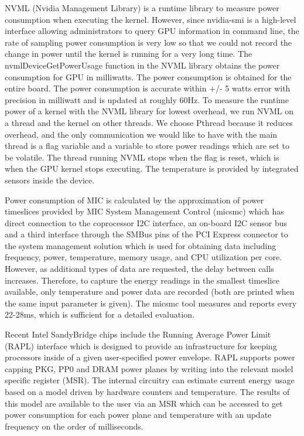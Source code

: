 NVML (Nvidia Management Library) \cite{R:16} is a runtime library to measure power consumption when executing the kernel. However, since nvidia-smi is a high-level interface allowing administrators to query GPU information in command line, the rate of sampling power consumption is very low so that we could not record the change in power until the kernel is running for a very long time. The nvmlDeviceGetPowerUsage function in the NVML library obtains the power consumption  for GPU in milliwatts. The power consumption is obtained for the entire board. The power consumption is accurate within +/- 5 watts error with precision in milliwatt and is updated at roughly 60Hz. To measure the runtime power of a kernel with the NVML library for lowest overhead, we run NVML on a thread and the kernel on other threads. We choose Pthread because it reduces overhead, and the only communication we would like to have with the main thread is a flag variable and a variable to store power readings which are set to be volatile. The thread running NVML stops when the flag is reset, which is when the GPU kernel stops executing. The temperature is provided by integrated sensors inside the device.

 Power consumption of MIC is calculated by the approximation of power timeslices provided by MIC System Management Control (micsmc) \cite{R:17} which has direct connection to the coprocessor I2C interface, an on-board I2C sensor bus and a third interface through the SMBus pins of the PCI Express connector to the system management solution which is used for obtaining data including frequency, power, temperature, memory usage, and CPU utilization per core. However, as additional types of data are requested, the delay between calls increases. Therefore, to capture the energy readings in the smallest timeslice available, only temperature and power data are recorded (both are printed when the same input parameter is given). The micsmc tool measures and reports every 22-28ms, which is sufficient for a detailed evaluation. 


 Recent Intel SandyBridge chips include the Running Average Power Limit (RAPL) interface \cite{R:15} which is designed to provide an infrastructure for keeping processors inside of a given user-specified power envelope. RAPL supports power capping PKG, PP0 and DRAM power planes by writing into the relevant model specific register (MSR). The internal circuitry can estimate current energy usage based on a model driven by hardware counters and temperature. The results of this model are available to the user via an MSR which can be accessed to get power consumption for each power plane and temperature with an update frequency on the order of milliseconds. 




